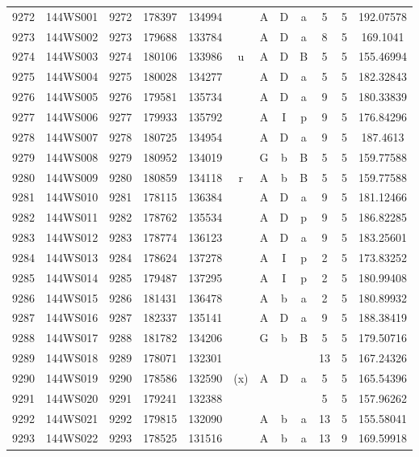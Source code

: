 \begin{tabular}{|*{12}{c|}}
9272 & 144WS001 & 9272 & 178397 & 134994 &  & A & D & a & 5 & 5 & 192.07578 \\ 
9273 & 144WS002 & 9273 & 179688 & 133784 &  & A & D & a & 8 & 5 & 169.1041 \\ 
9274 & 144WS003 & 9274 & 180106 & 133986 & u & A & D & B & 5 & 5 & 155.46994 \\ 
9275 & 144WS004 & 9275 & 180028 & 134277 &  & A & D & a & 5 & 5 & 182.32843 \\ 
9276 & 144WS005 & 9276 & 179581 & 135734 &  & A & D & a & 9 & 5 & 180.33839 \\ 
9277 & 144WS006 & 9277 & 179933 & 135792 &  & A & I & p & 9 & 5 & 176.84296 \\ 
9278 & 144WS007 & 9278 & 180725 & 134954 &  & A & D & a & 9 & 5 & 187.4613 \\ 
9279 & 144WS008 & 9279 & 180952 & 134019 &  & G & b & B & 5 & 5 & 159.77588 \\ 
9280 & 144WS009 & 9280 & 180859 & 134118 & r & A & b & B & 5 & 5 & 159.77588 \\ 
9281 & 144WS010 & 9281 & 178115 & 136384 &  & A & D & a & 9 & 5 & 181.12466 \\ 
9282 & 144WS011 & 9282 & 178762 & 135534 &  & A & D & p & 9 & 5 & 186.82285 \\ 
9283 & 144WS012 & 9283 & 178774 & 136123 &  & A & D & a & 9 & 5 & 183.25601 \\ 
9284 & 144WS013 & 9284 & 178624 & 137278 &  & A & I & p & 2 & 5 & 173.83252 \\ 
9285 & 144WS014 & 9285 & 179487 & 137295 &  & A & I & p & 2 & 5 & 180.99408 \\ 
9286 & 144WS015 & 9286 & 181431 & 136478 &  & A & b & a & 2 & 5 & 180.89932 \\ 
9287 & 144WS016 & 9287 & 182337 & 135141 &  & A & D & a & 9 & 5 & 188.38419 \\ 
9288 & 144WS017 & 9288 & 181782 & 134206 &  & G & b & B & 5 & 5 & 179.50716 \\ 
9289 & 144WS018 & 9289 & 178071 & 132301 &  &  &  &  & 13 & 5 & 167.24326 \\ 
9290 & 144WS019 & 9290 & 178586 & 132590 & (x) & A & D & a & 5 & 5 & 165.54396 \\ 
9291 & 144WS020 & 9291 & 179241 & 132388 &  &  &  &  & 5 & 5 & 157.96262 \\ 
9292 & 144WS021 & 9292 & 179815 & 132090 &  & A & b & a & 13 & 5 & 155.58041 \\ 
9293 & 144WS022 & 9293 & 178525 & 131516 &  & A & b & a & 13 & 9 & 169.59918 \\ 

\end{tabular}
